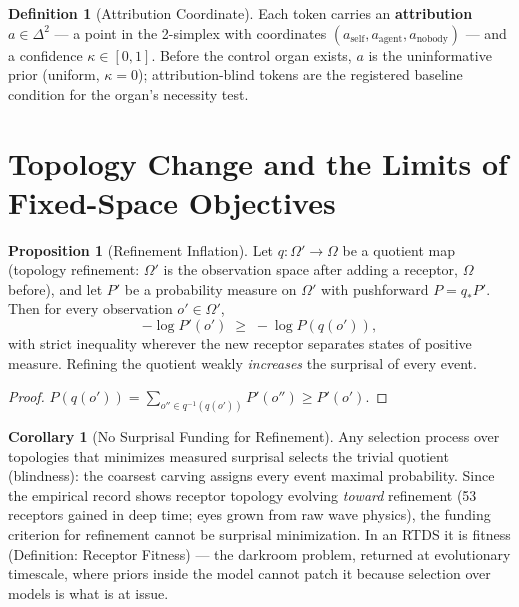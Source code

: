 \documentclass[12pt]{article}
\theoremstyle{definition}
\newtheorem{definition}{Definition}
\newtheorem{proposition}{Proposition}
\newtheorem{corollary}{Corollary}
\begin{document}
\begin{definition}[Attribution Coordinate]
Each token carries an \textbf{attribution} $a \in \Delta^2$ --- a point in the 2-simplex
with coordinates $(a_{\text{self}}, a_{\text{agent}}, a_{\text{nobody}})$ --- and a
confidence $\kappa \in [0,1]$. Before the control organ exists, $a$ is the uninformative
prior (uniform, $\kappa = 0$); attribution-blind tokens are the registered baseline
condition for the organ's necessity test.
\end{definition}

\section{Topology Change and the Limits of Fixed-Space Objectives}

\begin{proposition}[Refinement Inflation]
Let $q : \Omega' \to \Omega$ be a quotient map (topology refinement: $\Omega'$ is the
observation space after adding a receptor, $\Omega$ before), and let $P'$ be a
probability measure on $\Omega'$ with pushforward $P = q_* P'$. Then for every
observation $o' \in \Omega'$,
\[
-\log P'(o') \;\geq\; -\log P(q(o')),
\]
with strict inequality wherever the new receptor separates states of positive measure.
Refining the quotient weakly \emph{increases} the surprisal of every event.
\end{proposition}
\begin{proof}
$P(q(o')) = \sum_{o'' \in q^{-1}(q(o'))} P'(o'') \geq P'(o')$.
\end{proof}

\begin{corollary}[No Surprisal Funding for Refinement]
Any selection process over topologies that minimizes measured surprisal selects the
trivial quotient (blindness): the coarsest carving assigns every event maximal
probability. Since the empirical record shows receptor topology evolving \emph{toward}
refinement (53 receptors gained in deep time; eyes grown from raw wave physics), the
funding criterion for refinement cannot be surprisal minimization. In an RTDS it is
fitness (Definition: Receptor Fitness) --- the darkroom problem, returned at
evolutionary timescale, where priors inside the model cannot patch it because selection
over models is what is at issue.
\end{corollary}
\end{document}

